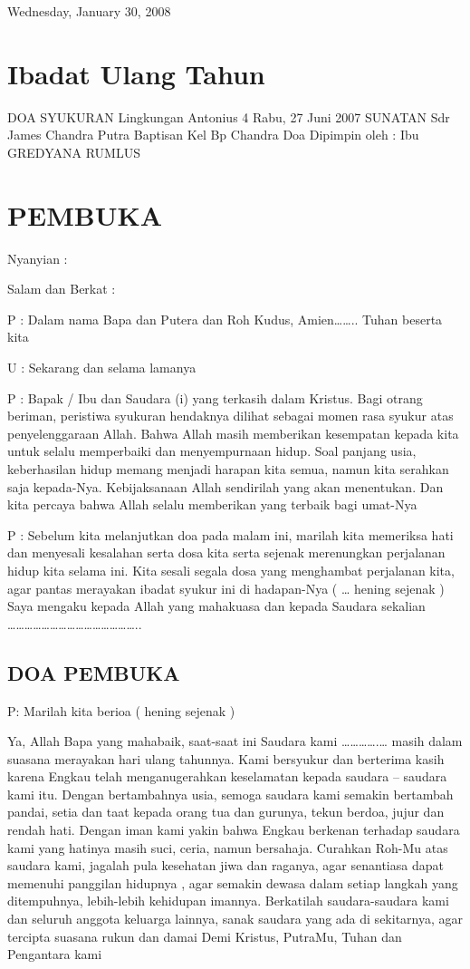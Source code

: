 \documentclass{article}
\title{}
\author{}
\date{2018-05-16}
\begin{document}
Wednesday, January 30, 2008

\section[Ibadat Ulang Tahun ]{Ibadat Ulang Tahun }
DOA SYUKURAN Lingkungan Antonius 4 Rabu, 27 Juni 2007 SUNATAN Sdr James Chandra Putra Baptisan Kel Bp Chandra Doa
Dipimpin oleh : Ibu GREDYANA RUMLUS  

\section{PEMBUKA}
 Nyanyian : 

Salam dan Berkat : 

P : {\dag} Dalam nama Bapa dan Putera dan Roh Kudus, Amien{\dots}{\dots}.. Tuhan beserta kita  

U : Sekarang dan selama lamanya 

P : Bapak / Ibu dan Saudara (i) yang terkasih dalam Kristus. Bagi otrang beriman, peristiwa syukuran hendaknya dilihat
sebagai momen rasa syukur atas penyelenggaraan Allah. Bahwa Allah masih memberikan kesempatan kepada kita untuk selalu
memperbaiki dan menyempurnaan hidup. Soal panjang usia, keberhasilan hidup memang menjadi harapan kita semua, namun
kita serahkan saja kepada-Nya. Kebijaksanaan Allah sendirilah yang akan menentukan. Dan kita percaya bahwa Allah selalu
memberikan yang terbaik bagi umat-Nya 

P : Sebelum kita melanjutkan doa pada malam ini, marilah kita memeriksa hati dan menyesali kesalahan serta dosa kita
serta sejenak merenungkan perjalanan hidup kita selama ini. Kita sesali segala dosa yang menghambat perjalanan kita,
agar pantas merayakan ibadat syukur ini di hadapan-Nya ( {\dots} hening sejenak ) Saya mengaku kepada Allah yang
mahakuasa dan kepada Saudara sekalian
{\dots}{\dots}{\dots}{\dots}{\dots}{\dots}{\dots}{\dots}{\dots}{\dots}{\dots}{\dots}{\dots}{\dots}{\dots}.. 

\subsection[DOA PEMBUKA]{DOA PEMBUKA }
P: Marilah kita berioa ( hening sejenak ) 

Ya, Allah Bapa yang mahabaik, saat-saat ini Saudara kami {\dots}{\dots}{\dots}{\dots}.{\dots} masih dalam suasana
merayakan hari ulang tahunnya. Kami bersyukur dan berterima kasih karena Engkau telah menganugerahkan keselamatan
kepada saudara -- saudara kami itu. Dengan bertambahnya usia, semoga saudara kami semakin bertambah pandai, setia dan
taat kepada orang tua dan gurunya, tekun berdoa, jujur dan rendah hati. Dengan iman kami yakin bahwa Engkau berkenan
terhadap saudara kami yang hatinya masih suci, ceria, namun bersahaja. Curahkan Roh-Mu atas saudara kami, jagalah pula
kesehatan jiwa dan raganya, agar senantiasa dapat memenuhi panggilan hidupnya , agar semakin dewasa dalam setiap
langkah yang ditempuhnya, lebih-lebih kehidupan imannya. Berkatilah saudara-saudara kami dan seluruh anggota keluarga
lainnya, sanak saudara yang ada di sekitarnya, agar tercipta suasana rukun dan damai Demi Kristus, PutraMu, Tuhan dan
Pengantara kami 
\end{document}
